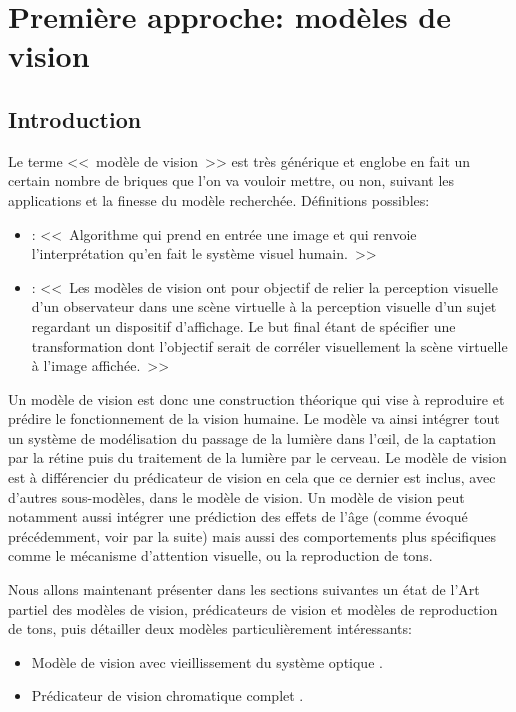 \part{Première approche: modèles de vision}
	\chapter*{Introduction}
	\par Le terme <<~modèle de vision~>> est très générique et englobe en fait un certain nombre de briques que l'on va vouloir mettre, ou non, suivant les applications et la finesse du modèle recherchée. Définitions possibles:
	\begin{itemize}
		\item \citep{moreau_traite_2006}: <<~Algorithme qui prend en entrée une image et qui renvoie l'interprétation qu'en fait le système visuel humain.~>>
		\item \citep{pattanaik_multiscale_1998}: <<~Les modèles de vision ont pour objectif de relier la perception visuelle d'un observateur dans une scène virtuelle à la perception visuelle d'un sujet regardant un dispositif d'affichage. Le but final étant de spécifier une transformation dont l'objectif serait de corréler visuellement la scène virtuelle à l'image affichée.~>>
	\end{itemize}
	
	\par Un modèle de vision est donc une construction théorique qui vise à reproduire et prédire le fonctionnement de la vision humaine. Le modèle va ainsi intégrer tout un système de modélisation du passage de la lumière dans l'œil, de la captation par la rétine puis du traitement de la lumière par le cerveau. Le modèle de vision est à différencier du prédicateur de vision en cela que ce dernier est inclus, avec d'autres sous-modèles, dans le modèle de vision. Un modèle de vision peut notamment aussi intégrer une prédiction des effets de l'âge (comme évoqué précédemment, voir par la suite) mais aussi des comportements plus spécifiques comme le mécanisme d'attention visuelle, ou la reproduction de tons.
	
	\par Nous allons maintenant présenter dans les sections suivantes un état de l'Art partiel des modèles de vision, prédicateurs de vision et modèles de reproduction de tons, puis détailler deux modèles particulièrement intéressants:
	\begin{itemize}
		\item Modèle de vision avec vieillissement du système optique \citep{mantiuk_human_2015}.
		\item Prédicateur de vision chromatique complet \citep{pattanaik_multiscale_1998}.
	\end{itemize}
	
